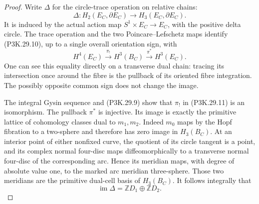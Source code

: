 \begin{proof}
Write \(\Delta\) for the circle-trace operation on relative
chains:
\[
 \Delta:H_2(E_C,\partial E_C)\longrightarrow
          H_3(E_C,\partial E_C).
                                                        \tag{P3K.29.10}
\]
It is induced by the actual action map
\(S^1\times E_C\to E_C\), with the positive delta circle.
The trace operation and the two Poincare--Lefschetz maps
identify (P3K.29.10), up to a single overall orientation
sign, with
\[
 H^4(E_C)\xrightarrow{\pi_!}H^3(B_C)
                    \xrightarrow{\pi^*}H^3(E_C).
                                                        \tag{P3K.29.11}
\]
One can see this equality directly on a transverse dual
chain: tracing its intersection once around the fibre is
the pullback of its oriented fibre integration. The
possibly opposite common sign does not change the image.

The integral Gysin sequence and (P3K.29.9) show that
\(\pi_!\) in (P3K.29.11) is an isomorphism. The pullback
\(\pi^*\) is injective. Its image is exactly the primitive
lattice of cohomology classes dual to \(m_1,m_2\).
Indeed \(m_0\) maps by the Hopf fibration to a two-sphere
and therefore has zero image in \(H_3(B_C)\). At an
interior point of either nonfixed curve, the quotient of
its circle tangent is a point, and its complex normal
four-disc maps diffeomorphically to a transverse normal
four-disc of the corresponding arc. Hence its meridian
maps, with degree of absolute value one, to the marked
arc meridian three-sphere. Those two meridians are the
primitive dual-cell basis of \(H_3(B_C)\). It follows
integrally that
\[
                       \operatorname{im}\Delta
                              =\mathbb ZD_1\oplus\mathbb ZD_2.
                                                        \tag{P3K.29.12}
\]


\end{proof}
